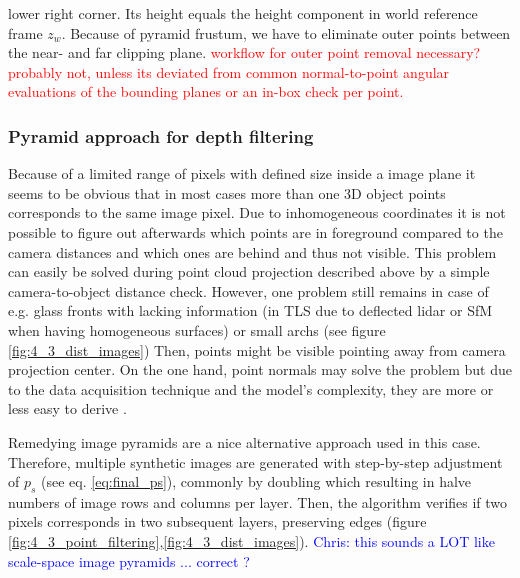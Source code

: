 \documentclass[review]{elsarticle}
\begin{document}
lower right corner. Its height equals the height component in world reference frame $z_w$. Because of pyramid frustum, we have to eliminate outer points between the near- and far clipping plane. \textcolor{red}{workflow for outer point removal necessary?}\textcolor{red}{probably not, unless its deviated from common normal-to-point angular evaluations of the bounding planes or an in-box check per point.}

\subsubsection{Pyramid approach for depth filtering}
Because of a limited range of pixels with defined size inside a image plane it seems to be obvious that in most cases more than one 3D object points corresponds to the same image pixel. Due to inhomogeneous coordinates it is not possible to figure out afterwards which points are in foreground compared to the camera distances and which ones are behind and thus not visible. This problem can easily be solved during point cloud projection described above by a simple camera-to-object distance check. However, one problem still remains in case of e.g. glass fronts with lacking information (in \gls{TLS} due to deflected lidar or \gls{SfM} when having homogeneous surfaces) or small archs (see figure \ref{fig:4_3_dist_images}) Then, points might be visible pointing away from camera projection center. On the one hand, point normals may solve the problem but due to the data acquisition technique and the model's complexity, they are more or less easy to derive \cite{Sattler2011}.

Remedying image pyramids are a nice alternative approach used in this case. Therefore, multiple synthetic images are generated with step-by-step adjustment of $p_s$ (see eq. \ref{eq:final_ps}), commonly by doubling which resulting in halve numbers of image rows and columns per layer. Then, the algorithm verifies if two pixels corresponds in two subsequent layers, preserving edges (figure \ref{fig:4_3_point_filtering},\ref{fig:4_3_dist_images}). \textcolor{blue}{Chris: this sounds a LOT like scale-space image pyramids ... correct ?}
\end{document}
